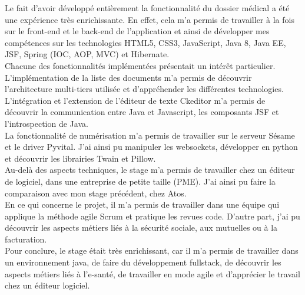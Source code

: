 Le fait d'avoir développé entièrement la fonctionnalité du dossier médical a été une expérience très enrichissante. En effet, cela m'a permis de travailler à la fois sur le front-end et le back-end de l'application et ainsi de développer mes compétences sur les technologies \gls{HTML5}, \gls{CSS3}, \gls{JavaScript}, \gls{Java 8}, \gls{Java EE}, \gls{JSF}, \gls{Spring} (\gls{IOC}, \gls{AOP}, \gls{MVC}) et \gls{Hibernate}. \\
Chacune des fonctionnalités implémentées présentait un intérêt particulier.\\
L'implémentation de la liste des documents m'a permis de découvrir l'architecture multi-tiers utilisée et d'appréhender les différentes technologies.\\ L'intégration et l'extension de l'éditeur de texte Ckeditor m'a permis de découvrir la communication entre Java et Javascript, les composants JSF et l'introspection de Java.\\
La fonctionnalité de numérisation m'a permis de travailler sur le serveur Sésame et le driver Pyvital. J'ai ainsi pu manipuler les websockets, développer en python et découvrir les librairies Twain et Pillow.\\

Au-delà des aspects techniques, le stage m'a permis de travailler chez un éditeur de logiciel, dans une entreprise de petite taille (PME). J'ai ainsi pu faire la comparaison avec mon stage précédent, chez Atos.\\
En ce qui concerne le projet, il m'a permis de travailler dans une équipe qui applique la méthode agile Scrum et pratique les revues code. D'autre part, j'ai pu découvrir les aspects métiers liés à la sécurité sociale, aux mutuelles ou à la facturation.\\

Pour conclure, le stage était très enrichissant, car il m'a permis de travailler dans un environnement java, de faire du développement fullstack, de découvrir les aspects métiers liés à l'e-santé, de travailler en mode agile et d'apprécier le travail chez un éditeur logiciel.



